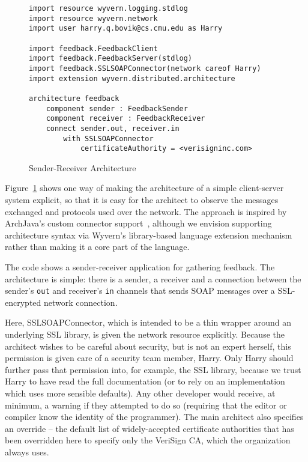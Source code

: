 \documentclass[runningheads]{llncs}
\begin{document}
\begin{sloppypar}
\begin{figure}[t]
\begin{lstlisting}
import resource wyvern.logging.stdlog
import resource wyvern.network
import user harry.q.bovik@cs.cmu.edu as Harry

import feedback.FeedbackClient
import feedback.FeedbackServer(stdlog)
import feedback.SSLSOAPConnector(network careof Harry)
import extension wyvern.distributed.architecture

architecture feedback
    component sender : FeedbackSender
    component receiver : FeedbackReceiver
    connect sender.out, receiver.in
        with SSLSOAPConnector
            certificateAuthority = <verisigninc.com>
\end{lstlisting}
\caption{Sender-Receiver Architecture}
\label{f-architecture}
\end{figure}

Figure~\ref{f-architecture} shows one way of making the architecture of a simple client-server system explicit, so that it is easy for the architect to observe the messages exchanged and protocols used over the network.  The approach is inspired by ArchJava's custom connector support~\cite{ASCN03}, although we envision supporting architecture syntax via Wyvern's library-based language extension mechanism~\cite{TSLs-ECOOP14} rather than making it a core part of the language.

The code shows a sender-receiver application for gathering feedback.  The architecture is simple: there is a sender, a receiver and a connection between the sender's \texttt{out} and receiver's \texttt{in} channels that sends SOAP messages over a SSL-encrypted network connection. 

Here, SSLSOAPConnector, which is intended to be a thin wrapper around an underlying SSL library, is given the network resource explicitly. Because the architect wishes to be careful about security, but is not an expert herself, this permission is given care of a security team member, Harry. Only Harry should further pass that permission into, for example, the SSL library, because we trust Harry to have read the full documentation (or to rely on an implementation which uses more sensible defaults). Any other developer would receive, at minimum, a warning if they attempted to do so (requiring that the editor or compiler know the identity of the programmer). The main architect also specifies an override -- the default list of widely-accepted certificate authorities that has been overridden here to specify only the VeriSign CA, which the organization always uses.



\end{sloppypar}
\end{document}
